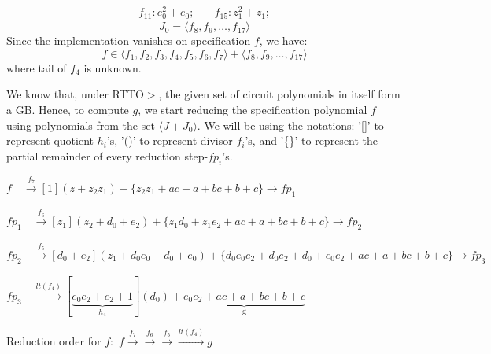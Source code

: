 \begin{Example}
\begin{align*}
 f_{11}:e_0^2 + e_0; &\quad f_{15}:z_1^2 + z_1;
\end{align*}
\begin{equation}
J_0 = \langle f_8,f_9,\dots,f_{17}\rangle
\end{equation}
Since the implementation vanishes on specification $f$, we have:
\begin{equation}
f \in \langle f_1,f_2,f_3,f_4,f_5,f_6,f_7\rangle+\langle f_8,f_9,\dots,f_{17}\rangle
\end{equation}
 where tail of $f_4$ is unknown.

We know that, under RTTO$>$, the given set of circuit polynomials in itself form a GB. Hence, to compute $g$, we start reducing the specification polynomial $f$ using polynomials from the set $\langle J + J_0\rangle$. We will be using the notations: '[]' to represent quotient-$h_i$'s, '()' to represent divisor-$f_i$'s, and '\{\}' to represent the partial remainder of every reduction step-$fp_i$'s.

\begin{small}
$f\quad\xrightarrow[]{f_7}[1](z+z_2z_1)+\{z_2z_1+ac+a+bc+b+c\}\rightarrow fp_1$

$fp_1\quad\xrightarrow[]{f_6}[z_1](z_2+d_0+e_2)+\{z_1d_0+z_1e_2+ac+a+bc+b+c\}\rightarrow fp_2$

$fp_2\quad\xrightarrow[]{f_5}[d_0+e_2](z_1+d_0e_0+d_0+e_0)+\{d_0e_0e_2+d_0e_2+d_0+e_0e_2+ac+a+bc+b+c\}\rightarrow fp_3$

$fp_3\quad\xrightarrow[]{lt(f_4)}[\underbrace{e_0e_2+e_2+1}_\text{$h_4$}](d_0)+ \underbrace{e_0e_2+ac+a+bc+b+c}_\text{g}$

\end{small}
Reduction order for $f:$
$f\xrightarrow[]{f_7}\xrightarrow[]{f_6}\xrightarrow[]{f_5}\xrightarrow[]{lt(f_4)}g$


\end{Example}
